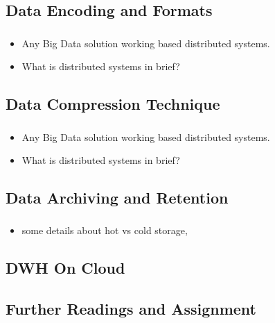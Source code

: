 \subsection{Data Encoding and Formats}

\begin{frame}
\frametitle{\subsecname}
\begin{itemize}[<+->]
	\item Any Big Data solution working based distributed systems.
	\item What is distributed systems in brief?
\end{itemize}
\end{frame}
\subsection{Data Compression Technique}

\begin{frame}
\frametitle{\subsecname}
\begin{itemize}[<+->]
\item Any Big Data solution working based distributed systems.
\item What is distributed systems in brief?
\end{itemize}
\end{frame}

\subsection{Data Archiving and Retention}
\begin{frame}
\frametitle{\subsecname}
\begin{itemize}[<+->]
	\item some details about hot vs cold storage,
\end{itemize}
\end{frame}


\subsection{DWH On Cloud}



\subsection{Further Readings and Assignment}


